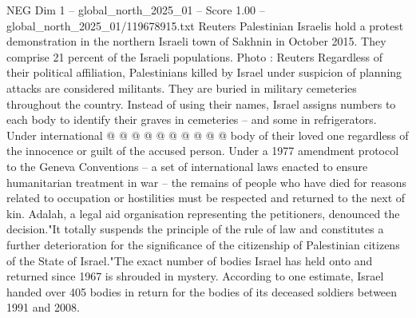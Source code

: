 \begin{textsample}{NEG Dim 1 – global\_north\_2025\_01 – Score 1.00 – global\_north\_2025\_01/119678915.txt}
Reuters Palestinian Israelis hold a protest demonstration in the northern Israeli town of Sakhnin in October 2015.
They comprise 21 percent of the Israeli populations.
Photo : Reuters Regardless of their political affiliation, Palestinians killed by Israel under suspicion of planning attacks are considered militants.
They are buried in military cemeteries throughout the country.
Instead of using their names, Israel assigns numbers to each body to identify their graves in cemeteries -- and some in refrigerators.
Under international @ @ @ @ @ @ @ @ @ @ body of their loved one regardless of the innocence or guilt of the accused person.
Under a 1977 amendment protocol to the Geneva Conventions -- a set of international laws enacted to ensure humanitarian treatment in war -- the remains of people who have died for reasons related to occupation or hostilities must be respected and returned to the next of kin.
Adalah, a legal aid organisation representing the petitioners, denounced the decision."It totally suspends the principle of the rule of law and constitutes a further deterioration for the significance of the citizenship of Palestinian citizens of the State of Israel."The exact number of bodies Israel has held onto and returned since 1967 is shrouded in mystery.
According to one estimate, Israel handed over 405 bodies in return for the bodies of its deceased soldiers between 1991 and 2008.

\end{textsample}
